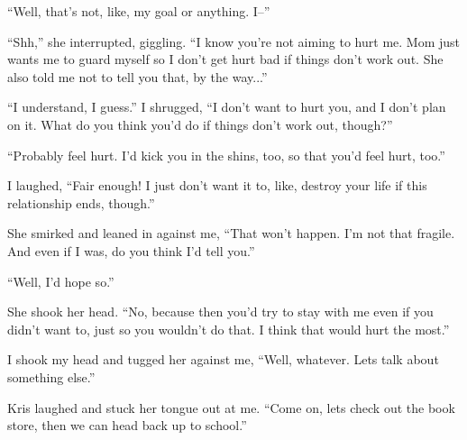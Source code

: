 ``Well, that's not, like, my goal or anything.  I--''

``Shh,'' she interrupted, giggling.  ``I know you're not aiming to hurt me.  Mom just wants me to guard myself so I don't get hurt bad if things don't work out.  She also told me not to tell you that, by the way...''

``I understand, I guess.''  I shrugged, ``I don't want to hurt you, and I don't plan on it.  What do you think you'd do if things don't work out, though?''

``Probably feel hurt.  I'd kick you in the shins, too, so that you'd feel hurt, too.''

I laughed, ``Fair enough!  I just don't want it to, like, destroy your life if this relationship ends, though.''

She smirked and leaned in against me, ``That won't happen.  I'm not that fragile.  And even if I was, do you think I'd tell you.''

``Well, I'd hope so.''

She shook her head.  ``No, because then you'd try to stay with me even if you didn't want to, just so you wouldn't do that.  I think that would hurt the most.''

I shook my head and tugged her against me, ``Well, whatever.  Lets talk about something else.''

Kris laughed and stuck her tongue out at me.  ``Come on, lets check out the book store, then we can head back up to school.''
